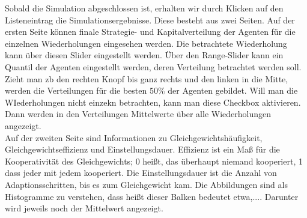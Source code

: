 \documentclass[parskip=full,11pt]{scrartcl}
\begin{document}
Sobald die Simulation abgeschlossen ist, erhalten wir durch Klicken auf den Listeneintrag die Simulationsergebnisse. Diese besteht aus zwei Seiten. Auf der ersten Seite können finale Strategie- und Kapitalverteilung der Agenten für die einzelnen Wiederholungen eingesehen werden. Die betrachtete Wiederholung kann über diesen Slider eingestellt werden. Über den Range-Slider kann ein Quantil der Agenten eingestellt werden, deren Verteilung betrachtet werden soll. Zieht man zb den rechten Knopf bis ganz rechts und den linken in die Mitte, werden die Verteilungen für die besten \(50\%\) der Agenten gebildet. Will man die WIederholungen nicht einzekn betrachten, kann man diese Checkbox aktivieren. Dann werden in den Verteilungen Mittelwerte über alle Wiederholungen angezeigt.\\
Auf der zweiten Seite sind Informationen zu Gleichgewichtshäufigkeit, Gleichgewichtseffizienz und Einstellungsdauer. Effizienz ist ein Maß für die Kooperativität des Gleichgewichts; 0 heißt, das überhaupt niemand kooperiert, 1 dass jeder mit jedem kooperiert. Die Einstellungsdauer ist die Anzahl von Adaptionsschritten, bis es zum Gleichgewicht kam. Die Abbildungen sind als Histogramme zu verstehen, dass heißt dieser Balken bedeutet etwa,.... Darunter wird jeweils noch der Mittelwert angezeigt.
\end{document}
